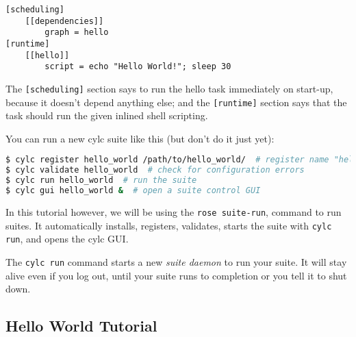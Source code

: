 \begin{lstlisting}[language=suiterc]
[scheduling]
    [[dependencies]]
        graph = hello
[runtime]
    [[hello]]
        script = echo "Hello World!"; sleep 30
\end{lstlisting}

The \lstinline{[scheduling]} section says to run the hello task immediately on
start-up, because it doesn't depend anything else; and the
\lstinline=[runtime]= section says that the task should run the given inlined
shell scripting.

You can run a new cylc suite like this (but don't do it just yet):

\begin{lstlisting}[language=bash]
$ cylc register hello_world /path/to/hello_world/  # register name "hello_world"
$ cylc validate hello_world  # check for configuration errors
$ cylc run hello_world  # run the suite
$ cylc gui hello_world &  # open a suite control GUI
\end{lstlisting}

In this tutorial however, we will be using the \lstinline{rose suite-run},
command to run suites.  It automatically installs, registers, validates, starts
the suite with \lstinline=cylc run=, and opens the cylc GUI.

The \lstinline{cylc run} command starts a new {\em suite daemon} to run your
suite.  It will stay alive even if you log out, until your suite runs to
completion or you tell it to shut down.


\subsection{Hello World Tutorial}

